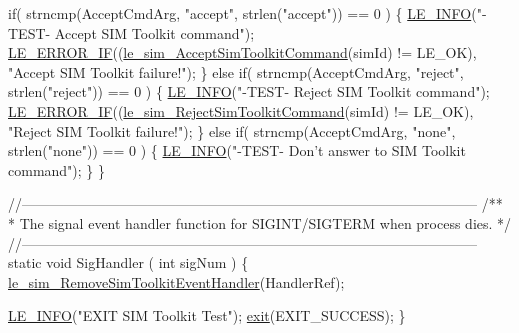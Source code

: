 \begin{DoxyCodeInclude}
{{{{    \textcolor{keywordflow}{if}( strncmp(AcceptCmdArg, \textcolor{stringliteral}{"accept"}, strlen(\textcolor{stringliteral}{"accept"})) == 0 )
    \{
        \hyperlink{le__log_8h_a23e6d206faa64f612045d688cdde5808}{LE\_INFO}(\textcolor{stringliteral}{"-TEST- Accept SIM Toolkit command"});
        \hyperlink{le__log_8h_aceaf11a11691d6c676e36dd317b38dbd}{LE\_ERROR\_IF}((\hyperlink{le__sim__interface_8h_a8cc75a17466446c19c5bd941b1360e0e}{le\_sim\_AcceptSimToolkitCommand}(simId) != 
      LE\_OK),
                    \textcolor{stringliteral}{"Accept SIM Toolkit failure!"});
    \}
    \textcolor{keywordflow}{else} \textcolor{keywordflow}{if}( strncmp(AcceptCmdArg, \textcolor{stringliteral}{"reject"}, strlen(\textcolor{stringliteral}{"reject"})) == 0 )
    \{
        \hyperlink{le__log_8h_a23e6d206faa64f612045d688cdde5808}{LE\_INFO}(\textcolor{stringliteral}{"-TEST- Reject SIM Toolkit command"});
        \hyperlink{le__log_8h_aceaf11a11691d6c676e36dd317b38dbd}{LE\_ERROR\_IF}((\hyperlink{le__sim__interface_8h_a8cbdc50d62ddd5ea80386d27e16d954f}{le\_sim\_RejectSimToolkitCommand}(simId) != 
      LE\_OK),
                    \textcolor{stringliteral}{"Reject SIM Toolkit failure!"});
    \}
    \textcolor{keywordflow}{else} \textcolor{keywordflow}{if}( strncmp(AcceptCmdArg, \textcolor{stringliteral}{"none"}, strlen(\textcolor{stringliteral}{"none"})) == 0 )
    \{
        \hyperlink{le__log_8h_a23e6d206faa64f612045d688cdde5808}{LE\_INFO}(\textcolor{stringliteral}{"-TEST- Don't answer to SIM Toolkit command"});
    \}
\}

\textcolor{comment}{//--------------------------------------------------------------------------------------------------}\textcolor{comment}{}
\textcolor{comment}{/**}
\textcolor{comment}{ * The signal event handler function for SIGINT/SIGTERM when process dies.}
\textcolor{comment}{ */}
\textcolor{comment}{//--------------------------------------------------------------------------------------------------}
\textcolor{keyword}{static} \textcolor{keywordtype}{void} SigHandler
(
    \textcolor{keywordtype}{int} sigNum
)
\{
    \hyperlink{le__sim__interface_8h_a2485840533f80632a61096b1d7c5d8f2}{le\_sim\_RemoveSimToolkitEventHandler}(HandlerRef);

    \hyperlink{le__log_8h_a23e6d206faa64f612045d688cdde5808}{LE\_INFO}(\textcolor{stringliteral}{"EXIT SIM Toolkit Test"});
    \hyperlink{app_stop_client_8c_a310220604a584e112ba8f7aa3dfe23f1}{exit}(EXIT\_SUCCESS);
\}

}}}}
\end{DoxyCodeInclude}
